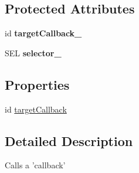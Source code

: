 \subsection*{Protected Attributes}
\begin{DoxyCompactItemize}
\item 
\hypertarget{interface_c_c_call_func_a53a590f689c89ff2e6b4ff1091d7a1be}{id {\bfseries target\-Callback\-\_\-}}\label{interface_c_c_call_func_a53a590f689c89ff2e6b4ff1091d7a1be}

\item 
\hypertarget{interface_c_c_call_func_a5c2e885cab6067aa37e254e258130c69}{S\-E\-L {\bfseries selector\-\_\-}}\label{interface_c_c_call_func_a5c2e885cab6067aa37e254e258130c69}

\end{DoxyCompactItemize}
\subsection*{Properties}
\begin{DoxyCompactItemize}
\item 
id \hyperlink{interface_c_c_call_func_acc274a007bfbeba47905391753188619}{target\-Callback}
\end{DoxyCompactItemize}


\subsection{Detailed Description}
Calls a 'callback' 

